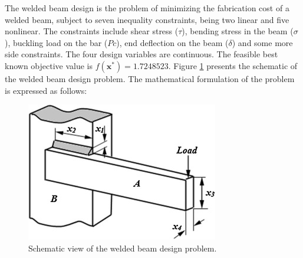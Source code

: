 
The welded beam design \citep{WB} is the problem of minimizing the fabrication cost of a welded beam, subject to seven inequality constraints, being two linear and five nonlinear. The constraints include shear stress ($\tau$), bending stress in the beam ($\sigma$), buckling load on the bar ($Pc$), end deflection on the beam ($\delta$) and some more side constraints. The four design variables are continuous. The feasible best known objective value is $f(\bm{x}^*) = 1.7248523$. Figure \ref{fig:WB} presents the schematic of the welded beam design problem. The mathematical formulation of the problem is expressed as follows:

\vspace{-0.5cm}



\vspace{0.5cm}

\begin{figure}[h]
    \begin{center}
    \includegraphics[scale=0.7]{Imgs/WB.jpg}
    \end{center}
    \captionsetup{justification=centering}
    \caption{Schematic view of the welded beam design problem.}\label{fig:WB}
\end{figure}
